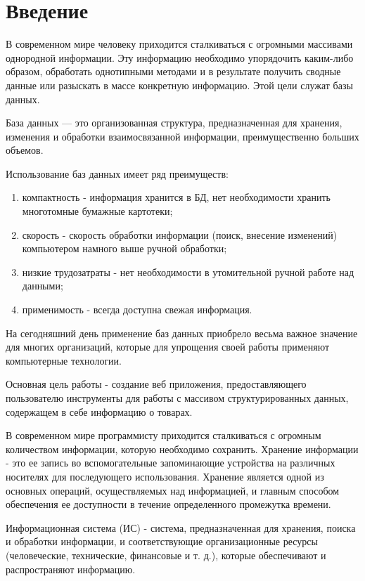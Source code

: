 \newpage

\section*{Введение} %

В современном мире человеку приходится сталкиваться с огромными массивами однородной информации.
Эту информацию необходимо упорядочить каким-либо образом, обработать однотипными методами
и в результате получить сводные данные или разыскать в массе конкретную информацию.
Этой цели служат базы данных.

База данных — это организованная структура, предназначенная для хранения,
изменения и обработки взаимосвязанной информации, преимущественно больших объемов.

Использование баз данных имеет ряд преимуществ:

\begin{enumerate}
    \item компактность - информация хранится в БД, нет необходимости хранить
    многотомные бумажные картотеки;
    \item скорость - скорость обработки информации (поиск, внесение изменений)
    компьютером намного выше ручной обработки;
    \item низкие трудозатраты - нет необходимости в утомительной ручной работе над данными;
    \item применимость - всегда доступна свежая информация.
\end{enumerate}

На сегодняшний день применение баз данных приобрело весьма важное значение для многих организаций,
которые для упрощения своей работы применяют компьютерные технологии.

Основная цель работы - создание веб приложения, предоставляющего пользователю инструменты для работы
с массивом структурированных данных, содержащем в себе информацию о товарах.

В современном мире программисту приходится сталкиваться с огромным количеством информации,
которую необходимо сохранить.
Хранение информации - это ее запись во вспомогательные запоминающие устройства на различных носителях
для последующего использования.
Хранение является одной из основных операций, осуществляемых над информацией,
и главным способом обеспечения ее доступности в течение определенного промежутка времени.

Информационная система (ИС) - система, предназначенная для хранения, поиска и обработки информации,
и соответствующие организационные ресурсы (человеческие, технические, финансовые и т. д.),
которые обеспечивают и распространяют информацию.

